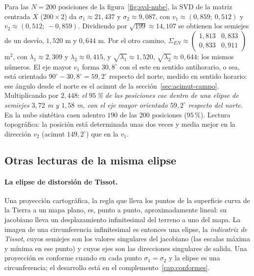 \begin{ejemplo}\label{ej:svd-elipse-error}
Para las \(N=200\) posiciones de la figura~\ref{fig:svd-nube}, la SVD de la matriz centrada
\(X\) (\(200\times2\)) da \(\sigma_1\approx21{,}437\) y \(\sigma_2\approx9{,}087\), con
\(v_1\approx(0{,}859;\ 0{,}512)\) y \(v_2\approx(0{,}512;\ -0{,}859)\). Dividiendo por
\(\sqrt{199}\approx14{,}107\) se obtienen los semiejes de un desvío,
\(1{,}520\) m y \(0{,}644\) m. Por el otro camino,
\(\Sigma_{EN}\approx\left(\begin{smallmatrix}1{,}813&0{,}833\\0{,}833&0{,}911\end{smallmatrix}\right)\)
m\(^2\), con \(\lambda_1\approx2{,}309\) y \(\lambda_2\approx0{,}415\), y \(\sqrt{\lambda_1}\approx1{,}520\), \(\sqrt{\lambda_2}\approx0{,}644\): los mismos números.
El eje mayor \(v_1\) forma \(30{,}8^\circ\) con el este en sentido antihorario, o sea, está
orientado \(90^\circ-30{,}8^\circ=59{,}2^\circ\) respecto del norte, medido en sentido
horario: ese ángulo desde el norte es el acimut de la sección~\ref{sec:acimut-campo}. Multiplicando por \(2{,}448\):
\emph{el \(95\)\,\% de las posiciones cae dentro de una elipse de semiejes \(3{,}72\) m y
\(1{,}58\) m, con el eje mayor orientado \(59{,}2^\circ\) respecto del norte}. En la nube
sintética caen adentro \(190\) de las \(200\) posiciones (\(95\)\,\%). Lectura topográfica:
la posición está determinada unas dos veces y media mejor en la dirección \(v_2\)
(acimut \(149{,}2^\circ\)) que en la \(v_1\).
\end{ejemplo}

\subsection{Otras lecturas de la misma elipse}

\paragraph{La elipse de distorsión de Tissot.} Una proyección cartográfica, la regla que lleva
los puntos de la superficie curva de la Tierra a un mapa plano, es, punto a punto,
aproximadamente lineal: su jacobiano lleva un desplazamiento infinitesimal del terreno a uno
del mapa. La imagen de una circunferencia infinitesimal es entonces una elipse, la
\emph{indicatriz de Tissot}, cuyos semiejes son los valores singulares del jacobiano (las
escalas máxima y mínima en ese punto) y cuyos ejes son las direcciones singulares de
salida. Una proyección es conforme cuando en cada punto \(\sigma_1=\sigma_2\) y la elipse es
una circunferencia; el desarrollo está en el complemento~\ref{cap:conformes}.

